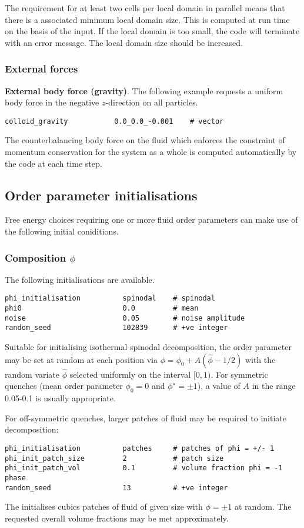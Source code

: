 The requirement for at least two cells per local domain in parallel
means that there is a associated minimum local domain size. This is
computed at run time on the basis of the input. If the local domain
is too small, the code will terminate with an error message. The
local domain size should be increased.


\subsubsection{External forces}

{\bf External body force (gravity)}.
The following example requests a uniform body force in the negative
$z$-direction on all particles.
\begin{lstlisting}
colloid_gravity           0.0_0.0_-0.001    # vector
\end{lstlisting}
The counterbalancing body force on the fluid which enforces the
constraint of momentum conservation for the system as a whole is
computed automatically by the code at each time step.


\subsection{Order parameter initialisations}

Free energy choices requiring one or more fluid order parameters can make
use of the following initial coniditions.

\subsubsection{Composition $\phi$}

The following initialisations are available.
\begin{lstlisting}
phi_initialisation          spinodal    # spinodal
phi0                        0.0         # mean
noise                       0.05        # noise amplitude
random_seed                 102839      # +ve integer
\end{lstlisting}
Suitable for initialising isothermal spinodal decomposition, the order
parameter may be set at random at each position via
$\phi = \phi_0 + A(\hat{\phi} - 1/2)$ with the random variate
$\hat\phi$ selected uniformly on the interval $[0,1)$. For symmetric
quenches (mean order parameter $\phi_0 = 0$ and $\phi^\star = \pm 1$),
a value of $A$ in the range 0.05-0.1 is usually appropriate.

For off-symmetric quenches, larger patches of fluid may be required to
initiate decomposition:
\begin{lstlisting}
phi_initialisation          patches     # patches of phi = +/- 1
phi_init_patch_size         2           # patch size
phi_init_patch_vol          0.1         # volume fraction phi = -1 phase
random_seed                 13          # +ve integer
\end{lstlisting}
The initialises cubics patches of fluid of given size with $\phi= \pm 1$
at random. The requested overall volume fractions may be met approximately.

